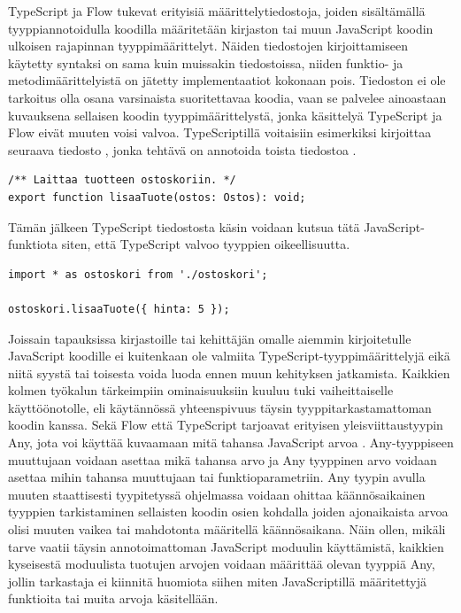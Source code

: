TypeScript ja Flow tukevat erityisiä määrittelytiedostoja, joiden sisältämällä
tyyppiannotoidulla koodilla määritetään kirjaston tai muun JavaScript koodin
ulkoisen rajapinnan tyyppimäärittelyt. Näiden tiedostojen kirjoittamiseen
käytetty syntaksi on sama kuin muissakin tiedostoissa, niiden funktio- ja
metodimäärittelyistä on jätetty implementaatiot kokonaan pois. Tiedoston ei
ole tarkoitus olla osana varsinaista suoritettavaa koodia, vaan se palvelee
ainoastaan kuvauksena sellaisen koodin tyyppimäärittelystä, jonka käsittelyä
TypeScript ja Flow eivät muuten voisi valvoa. TypeScriptillä voitaisiin
esimerkiksi kirjoittaa seuraava tiedosto , jonka
tehtävä on annotoida toista tiedostoa .

\begin{minipage}{\linewidth}
\begin{lstlisting}[caption={Esimerkki TypeScript määrittelytiedostosta ostoskori.d.ts}]
/** Laittaa tuotteen ostoskoriin. */
export function lisaaTuote(ostos: Ostos): void;
\end{lstlisting}
\end{minipage}
Tämän jälkeen TypeScript tiedostosta käsin voidaan kutsua tätä
JavaScript-funktiota siten, että TypeScript valvoo
tyyppien oikeellisuutta.

\begin{minipage}{\linewidth}
\begin{lstlisting}[caption={JavaScript koodin kutsuminen TypeScript tiedostosta tuotesivu.ts}]
import * as ostoskori from './ostoskori';

ostoskori.lisaaTuote({ hinta: 5 });
\end{lstlisting}
\end{minipage}

Joissain tapauksissa kirjastoille tai kehittäjän omalle aiemmin kirjoitetulle
JavaScript koodille ei kuitenkaan ole valmiita TypeScript-tyyppimäärittelyjä
eikä niitä syystä tai toisesta voida luoda ennen muun kehityksen jatkamista.
Kaikkien kolmen työkalun tärkeimpiin ominaisuuksiin kuuluu tuki vaiheittaiselle
käyttöönotolle, eli käytännössä yhteenspivuus täysin tyyppitarkastamattoman
koodin kanssa. Sekä Flow että TypeScript tarjoavat erityisen
yleisviittaustyypin Any, jota voi käyttää kuvaamaan mitä tahansa JavaScript
arvoa \cite{TypeScriptSpec}. Any-tyyppiseen muuttujaan voidaan asettaa mikä
tahansa arvo ja Any tyyppinen arvo voidaan asettaa mihin tahansa muuttujaan
tai funktioparametriin. Any tyypin avulla muuten staattisesti tyypitetyssä
ohjelmassa voidaan ohittaa käännösaikainen tyyppien tarkistaminen sellaisten
koodin osien kohdalla joiden ajonaikaista arvoa olisi muuten vaikea tai
mahdotonta määritellä käännösaikana. Näin ollen, mikäli tarve vaatii täysin
annotoimattoman JavaScript moduulin käyttämistä, kaikkien kyseisestä moduulista
tuotujen arvojen voidaan määrittää olevan tyyppiä Any, jollin tarkastaja ei
kiinnitä huomiota siihen miten JavaScriptillä määritettyjä funktioita tai
muita arvoja käsitellään.